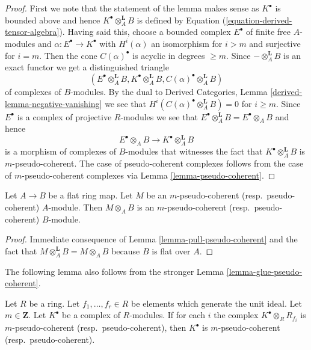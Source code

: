 \begin{proof}
First we note that the statement of the lemma makes sense as
$K^\bullet$ is bounded above and hence $K^\bullet \otimes_A^{\mathbf{L}} B$
is defined by Equation (\ref{equation-derived-tensor-algebra}).
Having said this, choose a bounded complex $E^\bullet$
of finite free $A$-modules and $\alpha : E^\bullet \to K^\bullet$
with $H^i(\alpha)$ an isomorphism for $i > m$ and surjective for
$i = m$. Then the cone $C(\alpha)^\bullet$ is acyclic in degrees
$\geq m$. Since $-\otimes_A^{\mathbf{L}} B$ is an exact functor
we get a distinguished triangle
$$
(E^\bullet \otimes_A^{\mathbf{L}} B, K^\bullet \otimes_A^{\mathbf{L}} B,
C(\alpha)^\bullet \otimes_A^{\mathbf{L}} B)
$$
of complexes of $B$-modules. By the dual to
Derived Categories, Lemma \ref{derived-lemma-negative-vanishing}
we see that $H^i(C(\alpha)^\bullet \otimes_A^{\mathbf{L}} B) = 0$
for $i \geq m$. Since $E^\bullet$ is a complex of projective $R$-modules
we see that $E^\bullet \otimes_A^{\mathbf{L}} B = E^\bullet \otimes_A B$
and hence
$$
E^\bullet \otimes_A B
\longrightarrow
K^\bullet \otimes_A^{\mathbf{L}} B
$$
is a morphism of complexes of $B$-modules that witnesses the
fact that $K^\bullet \otimes_A^{\mathbf{L}} B$ is $m$-pseudo-coherent.
The case of pseudo-coherent complexes follows from the case
of $m$-pseudo-coherent complexes via
Lemma \ref{lemma-pseudo-coherent}.
\end{proof}

\begin{lemma}
\label{lemma-flat-base-change-pseudo-coherent}
Let $A \to B$ be a flat ring map.
Let $M$ be an $m$-pseudo-coherent (resp.\ pseudo-coherent)
$A$-module. Then $M \otimes_A B$
is an $m$-pseudo-coherent (resp.\ pseudo-coherent) $B$-module.
\end{lemma}

\begin{proof}
Immediate consequence of
Lemma \ref{lemma-pull-pseudo-coherent}
and the fact that $M \otimes_A^{\mathbf{L}} B = M \otimes_A B$
because $B$ is flat over $A$.
\end{proof}

\noindent
The following lemma also follows from the stronger
Lemma \ref{lemma-glue-pseudo-coherent}.

\begin{lemma}
\label{lemma-glue-pseudo-coherent}
Let $R$ be a ring. Let $f_1, \ldots, f_r \in R$ be elements which
generate the unit ideal. Let $m \in \mathbf{Z}$. Let $K^\bullet$
be a complex of $R$-modules. If for each $i$ the complex
$K^\bullet \otimes_R R_{f_i}$ is $m$-pseudo-coherent
(resp.\ pseudo-coherent), then $K^\bullet$ is $m$-pseudo-coherent
(resp.\ pseudo-coherent).
\end{lemma}

